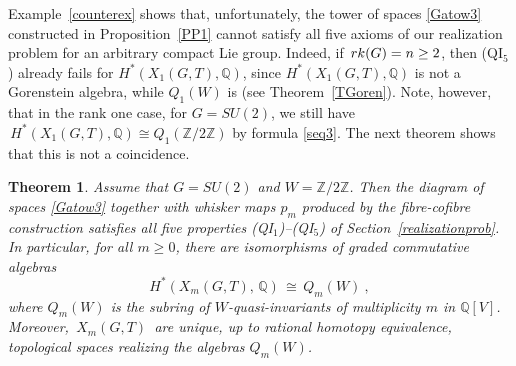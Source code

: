 \documentclass[11pt]{amsart}
\newtheorem{theorem}{Theorem}[section]
\theoremstyle{definition}
\theoremstyle{remark}
\numberwithin{equation}{section}
\newcommand{\la}{\label}
\def\Z{\mathbb{Z}}
\def\Q{\mathbb{Q}}
\begin{document}
Example~\ref{counterex} shows that, unfortunately, the tower of spaces \eqref{Gatow3} constructed in Proposition~\ref{PP1} cannot satisfy all five axioms of our realization problem for an arbitrary compact Lie group. Indeed, if $\, {\rm rk}(G) = n \ge 2 $, then (QI$_{5}$) already fails for $ H^*(X_1(G,T), \Q) $, since $ H^*(X_1(G,T), \Q) $ is not a Gorenstein algebra, while $ Q_1(W) $ is (see Theorem~\ref{TGoren}). Note, however, that in the rank one case, for $ G = SU(2) $, we still have $\, H^*(X_1(G,T), \Q) \cong Q_1(\Z/2\Z) $ by formula
\eqref{seq3}. The next theorem shows that this is not a coincidence.
%
\begin{theorem}\la{MTh1} 
Assume that $ G = SU(2) $ and $W = \Z/2\Z$. Then the diagram of spaces \eqref{Gatow3} together with whisker maps $ p_m $ 
produced by the fibre-cofibre construction satisfies all five properties {\rm (QI$_{1}$)--(QI$_{5}$)} of Section~\ref{realizationprob}. 
In particular, for all $m \ge 0$, there are isomorphisms of graded commutative algebras
%
\begin{equation}
\la{cohalg1}
H^*(X_m(G, T),\, \Q)\,\cong\, Q_m(W)\ ,%
\end{equation}
%
where $ Q_m(W)$ is the subring of $W$-quasi-invariants of multiplicity $m$ in $\Q[V]$.
Moreover, $\,X_m(G, T)\,$ are unique, up to rational homotopy equivalence, topological spaces realizing the algebras $ Q_m(W) $.

\end{theorem}
%
\end{document}

